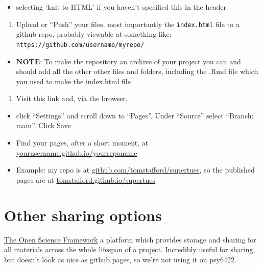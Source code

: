 \documentclass[
]{book}
\providecommand{\tightlist}{%
  \setlength{\itemsep}{0pt}\setlength{\parskip}{0pt}}
\begin{document}
\begin{itemize}
\tightlist
\item
  selecting `knit to HTML' if you haven't specified this in the header
\end{itemize}

\begin{enumerate}
\def\labelenumi{\arabic{enumi}.}
\setcounter{enumi}{4}
\tightlist
\item
  Upload or ``Push'' your files, most importantly the \texttt{index.html} file to a github repo, probably viewable at something like: \texttt{https://github.com/username/myrepo/}
\end{enumerate}

\begin{itemize}
\tightlist
\item
  \textbf{NOTE}: To make the repository an archive of your project you can and should add all the other other files and folders, including the .Rmd file which you used to make the index.html file
\end{itemize}

\begin{enumerate}
\def\labelenumi{\arabic{enumi}.}
\setcounter{enumi}{5}
\tightlist
\item
  Visit this link and, via the browser,
\end{enumerate}

\begin{itemize}
\tightlist
\item
  click ``Settings'' and scroll down to ``Pages''. Under ``Source'' select ``Branch: main''. Click Save
\item
  Find your pages, after a short moment, at \href{}{yourusername.github.io/yourreponame}
\item
  Example: my repo is at \href{https://github.com/tomstafford/supertues}{github.com/tomstafford/supertues}, so the published pages are at \href{https://tomstafford.github.io/supertues/}{tomstafford.github.io/supertues}
\end{itemize}

\hypertarget{other-sharing-options}{%
\section{Other sharing options}\label{other-sharing-options}}

\href{OSF.io}{The Open Science Framework} a platform which provides storage and sharing for all materials across the whole lifespan of a project. Incredibly useful for sharing, but doesn't look as nice as github pages, so we're not using it on psy6422.
\end{document}
